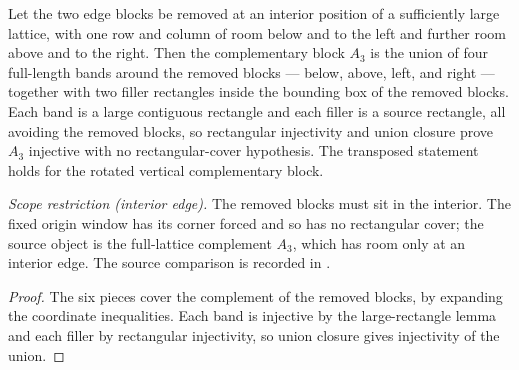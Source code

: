 \begin{lemma}%
    \label{lem:peps_normalSquareInteriorEdgeComplement_injective}
    \leanok
    Let the two edge blocks be removed at an interior position of a sufficiently
    large lattice, with one row and column of room below and to the left and
    further room above and to the right. Then the complementary block $A_3$ is
    the union of four full-length bands around the removed blocks --- below,
    above, left, and right --- together with two filler rectangles inside the
    bounding box of the removed blocks. Each band is a large contiguous
    rectangle and each filler is a source rectangle, all avoiding the removed
    blocks, so rectangular injectivity and union closure prove $A_3$ injective
    with no rectangular-cover hypothesis. The transposed statement holds for the
    rotated vertical complementary block.

    \emph{Scope restriction (interior edge).} The removed blocks must sit in the
    interior. The fixed origin window has its corner forced and so has no
    rectangular cover; the source object is the full-lattice complement $A_3$,
    which has room only at an interior edge. The source comparison is recorded
    in .
\end{lemma}
\begin{proof}\leanok
    The six pieces cover the complement of the removed blocks, by expanding the
    coordinate inequalities. Each band is injective by the large-rectangle
    lemma and each filler by rectangular injectivity, so union closure gives
    injectivity of the union.
\end{proof}

